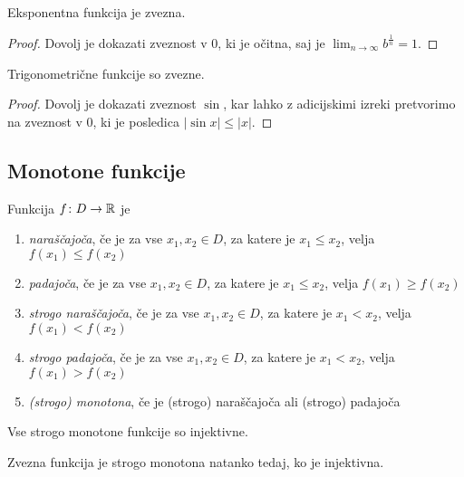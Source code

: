 \documentclass[12pt, a4paper]{article}
\begin{document}
\begin{opomba}
Eksponentna funkcija je zvezna.
\end{opomba}

\begin{proof}
Dovolj je dokazati zveznost v $0$, ki je očitna, saj je $\displaystyle\lim_{n\to\infty}b^{\frac{1}{n}}=1$.
\end{proof}

\begin{trditev}
Trigonometrične funkcije so zvezne.
\end{trditev}

\begin{proof}
Dovolj je dokazati zveznost $\sin$, kar lahko z adicijskimi izreki pretvorimo na zveznost v $0$, ki je posledica $|\sin x|\leq |x|$.
\end{proof}

\newpage

\subsection{Monotone funkcije}

\begin{definicija}
Funkcija $f\colon D\to\mathbb{R}$ je

\begin{enumerate}[label=\roman*)]
\item \emph{naraščajoča}, če je za vse $x_1,x_2\in D$, za katere je $x_1\leq x_2$, velja $f(x_1)\leq f(x_2)$
\item \emph{padajoča}, če je za vse $x_1,x_2\in D$, za katere je $x_1\leq x_2$, velja $f(x_1)\geq f(x_2)$
\item \emph{strogo naraščajoča}, če je za vse $x_1,x_2\in D$, za katere je $x_1<x_2$, velja $f(x_1)<f(x_2)$
\item \emph{strogo padajoča}, če je za vse $x_1,x_2\in D$, za katere je $x_1<x_2$, velja $f(x_1)>f(x_2)$
\item \emph{(strogo) monotona}, če je (strogo) naraščajoča ali (strogo) padajoča
\end{enumerate}
\end{definicija}

\begin{posledica}
Vse strogo monotone funkcije so injektivne.
\end{posledica}

\begin{posledica}
Zvezna funkcija je strogo monotona natanko tedaj, ko je injektivna.
\end{posledica}
\end{document}
